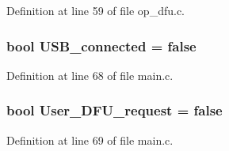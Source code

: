 \-Definition at line 59 of file op\-\_\-dfu.\-c.

\hypertarget{group___revo_mini_b_l_ga4e4577933ec2d1b36fd2a19510090d43}{
\subsubsection[{\-U\-S\-B\-\_\-connected}]{\setlength{\rightskip}{0pt plus 5cm}bool {\bf \-U\-S\-B\-\_\-connected} = false}}\label{group___revo_mini_b_l_ga4e4577933ec2d1b36fd2a19510090d43}


\-Definition at line 68 of file main.\-c.

\hypertarget{group___revo_mini_b_l_ga4df4c80fe3df830049b9543a72b125a5}{
\subsubsection[{\-User\-\_\-\-D\-F\-U\-\_\-request}]{\setlength{\rightskip}{0pt plus 5cm}bool {\bf \-User\-\_\-\-D\-F\-U\-\_\-request} = false}}\label{group___revo_mini_b_l_ga4df4c80fe3df830049b9543a72b125a5}


\-Definition at line 69 of file main.\-c.

